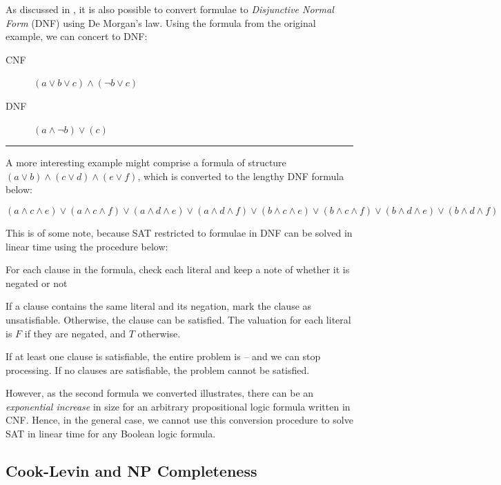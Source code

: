 \documentclass[a4paper,openany,12pt]{book}
\def \spacedrule {\textcolor{id7-aubergine}{\hrule}\vspace{1em}}
\begin{document}
As discussed in \citet{miltersen2005converting}, it is also possible to convert formulae to \emph{Disjunctive Normal Form} (DNF) using De Morgan's law. Using the formula from the original example, we can concert to DNF:

    \begin{description}
        \item[CNF] \(
        (a \lor b \lor c) \land (\neg b \lor c)
        \)
        \item[DNF] \(
        (a \land \neg b) \lor (c)
        \)
    \end{description}
    
    \spacedrule{}
    
    A more interesting example might comprise a formula of structure  \(
    (a \lor b) \land (c \lor d) \land (e \lor f)
    \), which is converted to the lengthy DNF formula below:
    
    \[
    (a \land c \land e) \lor (a \land c \land f) \lor (a \land d \land e) \lor (a \land d \land 
    f) \lor (b \land c \land e) \lor (b \land c \land f) \lor (b \land d \land e) \lor (b \land d \land
    f)
    \]
    \vspace{0.25em}

This is of some note, because SAT restricted to formulae in DNF can be solved in linear time using the procedure below:


\begin{outline}
	\1 For each clause in the formula, check each literal and keep a note of whether it is negated or not

	\2 If a clause contains the same literal and its negation, mark the clause as unsatisfiable.
	\2 Otherwise, the clause can be satisfied. The valuation for each literal is $F$ if they are negated, and $T$ otherwise.

	\1 If at least one clause is satisfiable, the entire problem is -- and we can stop processing.
	\1 If no clauses are satisfiable, the problem cannot be satisfied.
\end{outline}



However, as the second formula we converted illustrates, there can be an \emph{exponential increase} in size for an arbitrary propositional logic formula written in CNF. Hence, in the general case, we cannot use this conversion procedure to solve SAT in linear time for any Boolean logic formula.

\subsection{Cook-Levin and NP Completeness}
\end{document}
